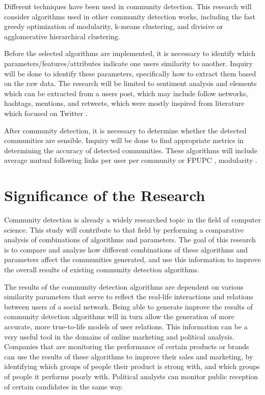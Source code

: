 Different techniques have been used in community detection. This research will consider algorithms used in other community detection works, including the fast greedy optimization of modularity, k-means clustering, and divisive or agglomerative hierarchical clustering.




Before the selected algorithms are implemented, it is necessary to identify which parameters/features/attributes indicate one user\vtick s similarity to another. Inquiry will be done to identify these parameters, specifically how to extract them based on the raw data. The research will be limited to sentiment analysis and elements which can be extracted from a user\vtick s post, which may include follow networks, hashtags, mentions, and retweets, which were mostly inspired from literature which focused on Twitter \cite{Deitrick:2013,Zhang:2012,Lim:2012:1}. 




After community detection, it is necessary to determine whether the detected communities are sensible. Inquiry will be done to find appropriate metrics in determining the accuracy of detected communities. These algorithms will include average mutual following links per user per community or FPUPC \cite{Zhang:2012}, modularity \cite{Deitrick:2013}.


\section{Significance of the Research}
\label{sec:significance}




Community detection is already a widely researched topic in the field of computer science. This study will contribute to that field by performing a comparative analysis of combinations of algorithms and parameters. The goal of this research is to compare and analyze how different combinations of these algorithms and parameters affect the communities generated, and use this information to improve the overall results of existing community detection algorithms. 


The results of the community detection algorithms are dependent on various similarity parameters that serve to reflect the real-life interactions and relations between users of a social network. Being able to generate improve the results of community detection algorithms will in turn allow the generation of more accurate, more true-to-life models of user relations. This information can be a very useful tool in the domains of online marketing and political analysis. Companies that are monitoring the performance of certain products or brands can use the results of these algorithms to improve their sales and marketing, by identifying which groups of people their product is strong with, and which groups of people it performs poorly with. Political analysts can monitor public reception of certain candidates in the same way.




